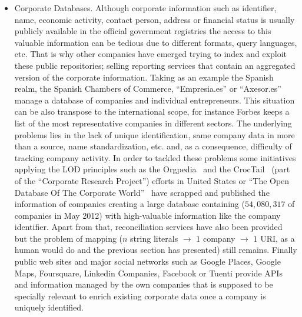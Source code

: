 \documentclass{llncs}
\begin{document}
\begin{itemize}
 
 \item Corporate Databases. Although corporate information such as identifier, name, economic activity, contact person, address or 
 financial status is usually publicly available in the official government registries the access to this valuable information can be 
 tedious due to different formats, query languages, etc. That is why other companies have emerged trying to index and exploit 
 these public repositories; selling reporting services that contain an aggregated version of the corporate information. Taking as 
 an example the Spanish realm, the Spanish Chambers of Commerce, ``Empresia.es'' or ``Axesor.es'' manage a database of companies and individual  entrepreneurs. This situation can be also transpose to the international scope, for instance Forbes keeps a list of 
 the most representative companies in different sectors. The underlying problems lies in the lack of unique identification, same company data in more 
 than a source, name standardization, etc. and, as a consequence, difficulty of tracking company activity. In order to tackled these problems some 
 initiatives applying the LOD principles such as the Orgpedia~\cite{Orgpedia} and the CrocTail~\cite{croctail} (part of the ``Corporate Research Project'') efforts in United States or 
 ``The Open Database Of The Corporate World''~\cite{Opencorporates} have scrapped and published the information 
 of companies creating a large database containing ($54,080,317$ of companies in May 2012) with high-valuable information like the company 
 identifier. Apart from that, reconciliation services have also been provided but the problem of mapping ($n$ string literals $\to$ $1$ company $\to$ $1$ URI, 
 as a human would do and the previous section has presented) still remains. Finally public web sites and major social networks such as Google 
 Places, Google Maps, Foursquare, Linkedin Companies, Facebook or Tuenti provide APIs and information managed by the own companies that is supposed 
 to be specially relevant to enrich existing corporate data once a company is uniquely identified.
 
\end{itemize}
\end{document}
